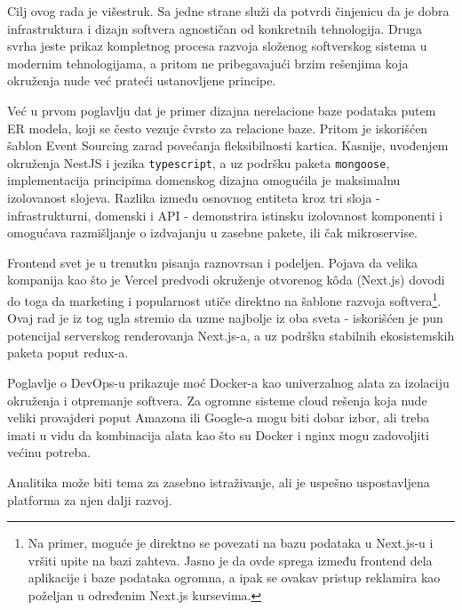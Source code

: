 \documentclass[12pt,oneside]{memoir}
\begin{document}
Cilj ovog rada je višestruk. Sa jedne strane služi da potvrdi činjenicu da je dobra infrastruktura i dizajn softvera agnostičan od konkretnih tehnologija. Druga svrha jeste prikaz kompletnog procesa razvoja složenog softverskog sistema u modernim tehnologijama, a pritom ne pribegavajući brzim rešenjima koja okruženja nude već prateći ustanovljene principe.

Već u prvom poglavlju dat je primer dizajna nerelacione baze podataka putem ER modela, koji se često vezuje čvrsto za relacione baze. Pritom je iskorišćen šablon Event Sourcing zarad povećanja fleksibilnosti kartica. Kasnije, uvođenjem okruženja NestJS i jezika \verb|typescript|, a uz podršku paketa \verb|mongoose|, implementacija principima domenskog dizajna omogućila je maksimalnu izolovanost slojeva. Razlika između osnovnog entiteta kroz tri sloja - infrastrukturni, domenski i API - demonstrira istinsku izolovanost komponenti i omogućava razmišljanje o izdvajanju u zasebne pakete, ili čak mikroservise.

Frontend svet je u trenutku pisanja raznovrsan i podeljen. Pojava da velika kompanija kao što je Vercel predvodi okruženje otvorenog k\^{o}da (Next.js) dovodi do toga da marketing i popularnost utiče direktno na šablone razvoja softvera\footnote{Na primer, moguće je direktno se povezati na bazu podataka u Next.js-u i vršiti upite na bazi zahteva. Jasno je da ovde sprega između frontend dela aplikacije i baze podataka ogromna, a ipak se ovakav pristup reklamira kao poželjan u određenim Next.js kursevima.}. Ovaj rad je iz tog ugla stremio da uzme najbolje iz oba sveta - iskorišćen je pun potencijal serverskog renderovanja Next.js-a, a uz podršku stabilnih ekosistemskih paketa poput redux-a.

Poglavlje o DevOps-u prikazuje moć Docker-a kao univerzalnog alata za izolaciju okruženja i otpremanje softvera. Za ogromne sisteme cloud rešenja koja nude veliki provajderi poput Amazona ili Google-a mogu biti dobar izbor, ali treba imati u vidu da kombinacija alata kao što su Docker i nginx mogu zadovoljiti većinu potreba.

Analitika može biti tema za zasebno istraživanje, ali je uspešno uspostavljena platforma za njen dalji razvoj.
\end{document}
